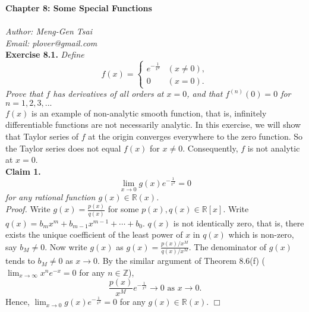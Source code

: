 \documentclass{article}
\begin{document}
\textbf{\Large Chapter 8: Some Special Functions} \\\\



\emph{Author: Meng-Gen Tsai} \\
\emph{Email: plover@gmail.com} \\





\textbf{Exercise 8.1.}
\emph{Define
\begin{equation*}
  f(x) =
    \begin{cases}
      e^{-\frac{1}{x^2}} & (x \neq 0), \\
      0                  & (x = 0).
    \end{cases}
\end{equation*}
Prove that $f$ has derivatives of all orders at $x = 0$,
and that $f^{(n)}(0) = 0$ for $n = 1, 2, 3, ...$} \\

$f(x)$ is an example of non-analytic smooth function, that is,
infinitely differentiable functions are not necessarily analytic.
In this exercise, we will show that Taylor series of $f$ at the origin
converges everywhere to the zero function.
So the Taylor series does not equal $f(x)$ for $x \neq 0$.
Consequently, $f$ is not analytic at $x = 0$. \\

\textbf{Claim 1.}
\emph{$$\lim_{x \rightarrow 0} g(x) e^{-\frac{1}{x^2}} = 0$$
for any rational function $g(x) \in \mathbb{R}(x)$.} \\

\emph{Proof.}
Write $g(x) = \frac{p(x)}{q(x)}$ for some $p(x), q(x) \in \mathbb{R}[x].$
Write $q(x) = b_m x^m + b_{m - 1} x^{m - 1} + \cdots + b_0$.
$q(x)$ is not identically zero, that is, there exists the unique coefficient
of the least power of $x$ in $q(x)$ which is non-zero, say $b_M \neq 0$.
Now write $g(x)$ as $g(x) = \frac{p(x)/x^M}{q(x)/x^M}$.
The denominator of $g(x)$ tends to $b_M \neq 0$ as $x \rightarrow 0$.
By the similar argument of Theorem 8.6(f)
($\lim_{x \rightarrow \infty} x^n e^{-x} = 0$ for any $n \in \mathbb{Z}$),
$$\frac{p(x)}{x^M} e^{-\frac{1}{x^2}} \rightarrow 0 \text{ as } x \rightarrow 0.$$
Hence, $\lim_{x \rightarrow 0} g(x) e^{-\frac{1}{x^2}} = 0$
for any $g(x) \in \mathbb{R}(x)$.
$\Box$ \\
\end{document}
